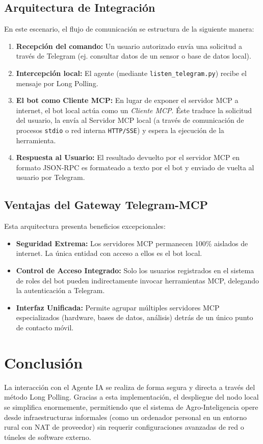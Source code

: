 \documentclass[12pt,a4paper]{article}
\begin{document}
\subsection{Arquitectura de Integración}
En este escenario, el flujo de comunicación se estructura de la siguiente manera:
\begin{enumerate}
    \item \textbf{Recepción del comando:} Un usuario autorizado envía una solicitud a través de Telegram (ej. consultar datos de un sensor o base de datos local).
    \item \textbf{Intercepción local:} El agente (mediante \texttt{listen\_telegram.py}) recibe el mensaje por Long Polling.
    \item \textbf{El bot como Cliente MCP:} En lugar de exponer el servidor MCP a internet, el bot local actúa como un \textit{Cliente MCP}. Éste traduce la solicitud del usuario, la envía al Servidor MCP local (a través de comunicación de procesos \texttt{stdio} o red interna \texttt{HTTP/SSE}) y espera la ejecución de la herramienta.
    \item \textbf{Respuesta al Usuario:} El resultado devuelto por el servidor MCP en formato JSON-RPC es formateado a texto por el bot y enviado de vuelta al usuario por Telegram.
\end{enumerate}

\subsection{Ventajas del Gateway Telegram-MCP}
Esta arquitectura presenta beneficios excepcionales:
\begin{itemize}
    \item \textbf{Seguridad Extrema:} Los servidores MCP permanecen 100\% aislados de internet. La única entidad con acceso a ellos es el bot local.
    \item \textbf{Control de Acceso Integrado:} Solo los usuarios registrados en el sistema de roles del bot pueden indirectamente invocar herramientas MCP, delegando la autenticación a Telegram.
    \item \textbf{Interfaz Unificada:} Permite agrupar múltiples servidores MCP especializados (hardware, bases de datos, análisis) detrás de un único punto de contacto móvil.
\end{itemize}

\section{Conclusión}
La interacción con el Agente IA se realiza de forma segura y directa a través del método Long Polling. Gracias a esta implementación, el despliegue del nodo local se simplifica enormemente, permitiendo que el sistema de Agro-Inteligencia opere desde infraestructuras informales (como un ordenador personal en un entorno rural con NAT de proveedor) sin requerir configuraciones avanzadas de red o túneles de software externo.
\end{document}
